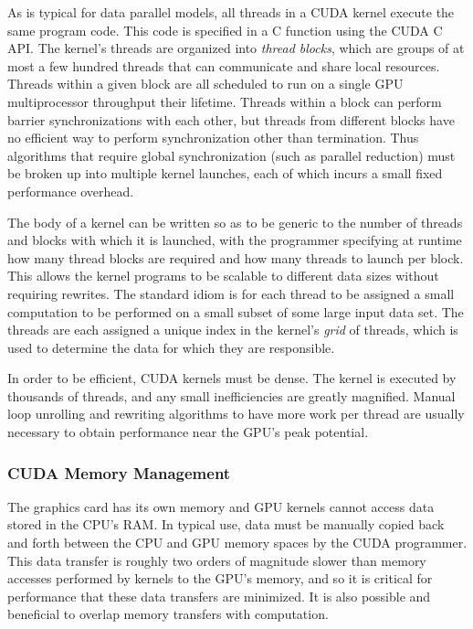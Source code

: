 \documentclass[preprint]{sigplanconf}
\begin{document}
As is typical for data parallel models, all threads in a CUDA kernel execute
the same program code.  This code is specified in a C function using the CUDA C
API. The kernel's threads are organized into {\it thread blocks}, which are
groups of at most a few hundred threads that can communicate and share local
resources. Threads within a given block are all scheduled to run on a single GPU
multiprocessor throughput their lifetime.  Threads within a block can
perform barrier synchronizations with each other, but threads from different
blocks have no efficient way to perform synchronization other than termination.
Thus algorithms that require global synchronization (such as parallel reduction)
must be broken up into multiple kernel launches, each of which incurs a small
fixed performance overhead.

The body of a kernel can be written so as to be generic to the number of
threads and blocks with which it is launched, with the programmer specifying at
runtime how many thread blocks are required and how many threads to launch per
block. This allows the kernel programs to be scalable to different data sizes
without requiring rewrites. The standard idiom is for each thread to
be assigned a small computation to be performed on a small subset of some large
input data set.  The threads are each assigned a unique index in the kernel's
{\it grid} of threads, which is used to determine the data for which they are
responsible.

In order to be efficient, CUDA kernels must be dense.  The kernel is executed
by thousands of threads, and any small inefficiencies are greatly magnified.
Manual loop unrolling and rewriting algorithms to have more work per thread are
usually necessary to obtain performance near the GPU's peak potential.

\subsubsection{CUDA Memory Management}

The graphics card has its own memory and GPU kernels cannot access data stored
in the CPU's RAM.  In typical use, data must be manually copied back and forth
between the CPU and GPU memory spaces by the CUDA programmer.  This data
transfer is roughly two orders of magnitude slower than memory accesses
performed by kernels to the GPU's memory, and so it is critical for performance
that these data transfers are minimized.  It is also possible and beneficial to
overlap memory transfers with computation.
\end{document}
